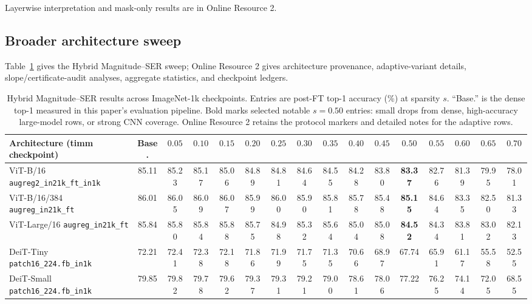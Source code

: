 \documentclass[11pt]{article}
\theoremstyle{plain}
\theoremstyle{definition}
\theoremstyle{remark}
\newcommand{\1}{\mathbf{1}}
\begin{document}
Layerwise interpretation and mask-only results are in Online Resource 2.

\subsection{Broader architecture sweep}
\label{subsec:architecture_validation}

Table~\ref{tab:multi_arch_hybrid} gives the Hybrid Magnitude--SER sweep; Online Resource 2 gives architecture provenance, adaptive-variant details, slope/certificate-audit analyses, aggregate statistics, and checkpoint ledgers.

\begin{table}[!htbp]
\centering
\caption{Hybrid Magnitude--SER results across ImageNet-1k checkpoints. Entries are post-FT top-1 accuracy (\%) at sparsity \(s\). ``Base.'' is the dense top-1 measured in this paper's evaluation pipeline. Bold marks selected notable \(s=0.50\) entries: small drops from dense, high-accuracy large-model rows, or strong CNN coverage. Online Resource 2 retains the protocol markers and detailed notes for the adaptive rows.}
\label{tab:multi_arch_hybrid}
\tiny
\setlength{\tabcolsep}{1.0pt}
\begin{tabular}{lccccccccccccccc}
\toprule
Architecture (timm checkpoint) & Base. & \(0.05\) & \(0.10\) & \(0.15\) & \(0.20\) & \(0.25\) & \(0.30\) & \(0.35\) & \(0.40\) & \(0.45\) & \(0.50\) & \(0.55\) & \(0.60\) & \(0.65\) & \(0.70\) \\
\midrule
ViT-B/16 \texttt{augreg2\_in21k\_ft\_in1k} & 85.11 & 85.23 & 85.17 & 85.06 & 84.89 & 84.81 & 84.64 & 84.55 & 84.28 & 83.80 & \textbf{83.37} & 82.76 & 81.39 & 79.95 & 78.01 \\
ViT-B/16/384 \texttt{augreg\_in21k\_ft}    & 86.01 & 86.05 & 86.09 & 86.07 & 85.99 & 86.00 & 85.90 & 85.81 & 85.78 & 85.48 & \textbf{85.15} & 84.64 & 83.35 & 82.50 & 81.33 \\
ViT-Large/16 \texttt{augreg\_in21k\_ft}    & 85.84 & 85.80 & 85.84 & 85.88 & 85.75 & 84.98 & 85.32 & 85.64 & 85.04 & 85.08 & \textbf{84.52} & 84.34 & 83.81 & 83.02 & 82.13 \\
DeiT-Tiny \texttt{patch16\_224.fb\_in1k}   & 72.21 & 72.41 & 72.38 & 72.18 & 71.86 & 71.99 & 71.75 & 71.35 & 70.66 & 68.97 & 67.74 & 65.91 & 61.17 & 55.58 & 52.55 \\
DeiT-Small \texttt{patch16\_224.fb\_in1k}  & 79.85 & 79.82 & 79.78 & 79.62 & 79.37 & 79.31 & 79.21 & 79.00 & 78.61 & 78.06 & 77.22 & 76.25 & 74.14 & 72.05 & 68.55 \\

\end{tabular}
\end{table}
\end{document}
